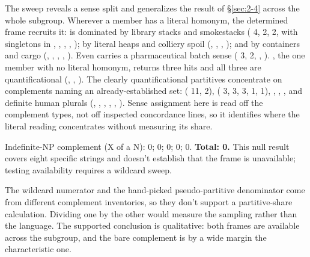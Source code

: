 The sweep reveals a sense split and generalizes the  result of §\ref{sec:2-4} across the whole subgroup. Wherever a member has a literal homonym, the determined frame recruits it:  is dominated by library stacks and smokestacks ( 4,  2,  2, with singletons in , , , , );  by literal heaps and colliery spoil (, , , );  and  by containers and cargo (, , , , ). Even  carries a pharmaceutical batch sense ( 3,  2, , ). , the one member with no literal homonym, returns three hits and all three are quantificational (, , ). The clearly quantificational partitives concentrate on complements naming an already-established set:  ( 11,  2),  ( 3,  3,  3,  1,  1), , , , and definite human plurals (, , , , , ). Sense assignment here is read off the complement types, not off inspected concordance lines, so it identifies where the literal reading concentrates without measuring its share.

Indefinite-NP complement (X of a N):  0;  0;  0;  0;  0. \textbf{Total: 0.} This null result covers eight specific strings and doesn't establish that the frame is unavailable; testing availability requires a wildcard sweep.

The wildcard numerator and the hand-picked pseudo-partitive denominator come from different complement inventories, so they don't support a partitive-share calculation. Dividing one by the other would measure the sampling rather than the language. The supported conclusion is qualitative: both frames are available across the subgroup, and the bare complement is by a wide margin the characteristic one.


